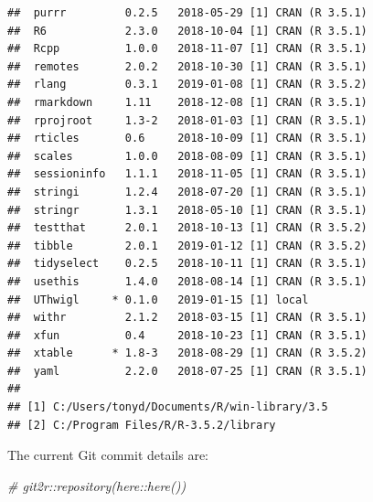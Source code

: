 \documentclass[]{elsarticle} %
\newenvironment{Shaded}{\begin{snugshade}}{\end{snugshade}}
\newcommand{\CommentTok}[1]{\textcolor[rgb]{0.56,0.35,0.01}{\textit{#1}}}
\begin{document}
\begin{verbatim}
##  purrr         0.2.5   2018-05-29 [1] CRAN (R 3.5.1)
##  R6            2.3.0   2018-10-04 [1] CRAN (R 3.5.1)
##  Rcpp          1.0.0   2018-11-07 [1] CRAN (R 3.5.1)
##  remotes       2.0.2   2018-10-30 [1] CRAN (R 3.5.1)
##  rlang         0.3.1   2019-01-08 [1] CRAN (R 3.5.2)
##  rmarkdown     1.11    2018-12-08 [1] CRAN (R 3.5.1)
##  rprojroot     1.3-2   2018-01-03 [1] CRAN (R 3.5.1)
##  rticles       0.6     2018-10-09 [1] CRAN (R 3.5.1)
##  scales        1.0.0   2018-08-09 [1] CRAN (R 3.5.1)
##  sessioninfo   1.1.1   2018-11-05 [1] CRAN (R 3.5.1)
##  stringi       1.2.4   2018-07-20 [1] CRAN (R 3.5.1)
##  stringr       1.3.1   2018-05-10 [1] CRAN (R 3.5.1)
##  testthat      2.0.1   2018-10-13 [1] CRAN (R 3.5.2)
##  tibble        2.0.1   2019-01-12 [1] CRAN (R 3.5.2)
##  tidyselect    0.2.5   2018-10-11 [1] CRAN (R 3.5.1)
##  usethis       1.4.0   2018-08-14 [1] CRAN (R 3.5.1)
##  UThwigl     * 0.1.0   2019-01-15 [1] local         
##  withr         2.1.2   2018-03-15 [1] CRAN (R 3.5.1)
##  xfun          0.4     2018-10-23 [1] CRAN (R 3.5.1)
##  xtable      * 1.8-3   2018-08-29 [1] CRAN (R 3.5.2)
##  yaml          2.2.0   2018-07-25 [1] CRAN (R 3.5.1)
## 
## [1] C:/Users/tonyd/Documents/R/win-library/3.5
## [2] C:/Program Files/R/R-3.5.2/library
\end{verbatim}

The current Git commit details are:

\begin{Shaded}
\begin{Highlighting}[]
\CommentTok{# git2r::repository(here::here())}
\end{Highlighting}
\end{Shaded}
\end{document}
